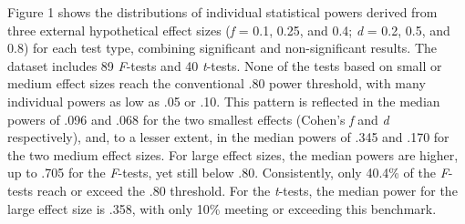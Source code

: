 \documentclass[authordate, meta, issue]{jote-new-article}
\begin{document}
	Figure 1 shows the distributions of individual statistical powers derived from three external hypothetical effect sizes (\emph{f} = 0.1, 0.25, and 0.4; \emph{d} = 0.2, 0.5, and 0.8) for each test type, combining significant and non-significant results. The dataset includes 89 \emph{F}-tests and 40 \emph{t}-tests. None of the tests based on small or medium effect sizes reach the conventional .80 power threshold, with many individual powers as low as .05 or .10. This pattern is reflected in the median powers of .096 and .068 for the two smallest effects (Cohen's \emph{f} and \emph{d} respectively), and, to a lesser extent, in the median powers of .345 and .170 for the two medium effect sizes. For large effect sizes, the median powers are higher, up to .705 for the \emph{F}-tests, yet still below .80. Consistently, only 40.4\% of the \emph{F}-tests reach or exceed the .80 threshold. For the \emph{t}-tests, the median power for the large effect size is .358, with only 10\% meeting or exceeding this benchmark.
\end{document}
